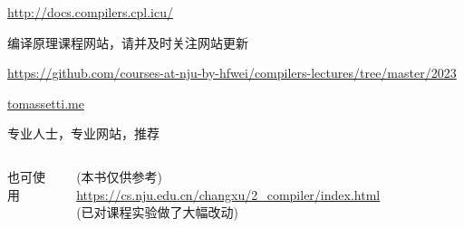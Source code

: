 \begin{frame}{}
  \begin{center}
    \url{http://docs.compilers.cpl.icu/} \\[5pt]


    编译原理课程网站，请并及时关注网站更新
  \end{center}
\end{frame}

\begin{frame}{}
  \begin{center}

    \vspace{0.50cm}
    \url{https://github.com/courses-at-nju-by-hfwei/compilers-lectures/tree/master/2023}
  \end{center}
\end{frame}

\begin{frame}{}
  \begin{center}
  \end{center}
\end{frame}

\begin{frame}{}

  \begin{center}
    \href{https://tomassetti.me/}{tomassetti.me}

    \vspace{0.30cm}
    专业人士，专业网站，推荐
  \end{center}
\end{frame}

\begin{frame}{}
  \begin{columns}
    \begin{center}
      也可使用
    \end{center}
    \begin{center}
      (本书仅供参考)
      \url{https://cs.nju.edu.cn/changxu/2_compiler/index.html} \\[3pt]
      (已对课程实验做了大幅改动)
    \end{center}
  \end{columns}
\end{frame}

